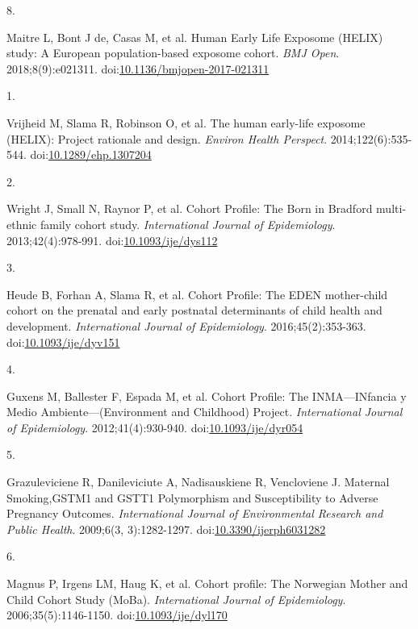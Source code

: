 \documentclass[
  letterpaper,
  DIV=11,
  numbers=noendperiod]{scrartcl}
\newlength{\cslhangindent}
\newlength{\csllabelwidth}
\newenvironment{CSLReferences}[2] %
 {\begin{list}{}{%
  \setlength{\itemindent}{0pt}
  \setlength{\leftmargin}{0pt}
  \setlength{\parsep}{0pt}
  \ifodd #1
   \setlength{\leftmargin}{\cslhangindent}
   \setlength{\itemindent}{-1\cslhangindent}
  \fi
  \setlength{\itemsep}{#2\baselineskip}}}
 {\end{list}}
\newcommand{\CSLLeftMargin}[1]{\parbox[t]{\csllabelwidth}{\strut#1\strut}}
\newcommand{\CSLRightInline}[1]{\parbox[t]{\linewidth - \csllabelwidth}{\strut#1\strut}}
\begin{document}
\begin{CSLReferences}{0}{1}
\CSLLeftMargin{8. }%
\CSLRightInline{Maitre L, Bont J de, Casas M, et al. Human {Early Life
Exposome} ({HELIX}) study: A {European} population-based exposome
cohort. \emph{BMJ Open}. 2018;8(9):e021311.
doi:\href{https://doi.org/10.1136/bmjopen-2017-021311}{10.1136/bmjopen-2017-021311}}

\CSLLeftMargin{1. }%
\CSLRightInline{Vrijheid M, Slama R, Robinson O, et al. The human
early-life exposome ({HELIX}): Project rationale and design.
\emph{Environ Health Perspect}. 2014;122(6):535-544.
doi:\href{https://doi.org/10.1289/ehp.1307204}{10.1289/ehp.1307204}}

\CSLLeftMargin{2. }%
\CSLRightInline{Wright J, Small N, Raynor P, et al. Cohort {Profile}:
{The Born} in {Bradford} multi-ethnic family cohort study.
\emph{International Journal of Epidemiology}. 2013;42(4):978-991.
doi:\href{https://doi.org/10.1093/ije/dys112}{10.1093/ije/dys112}}

\CSLLeftMargin{3. }%
\CSLRightInline{Heude B, Forhan A, Slama R, et al. Cohort {Profile}:
{The EDEN} mother-child cohort on the prenatal and early postnatal
determinants of child health and development. \emph{International
Journal of Epidemiology}. 2016;45(2):353-363.
doi:\href{https://doi.org/10.1093/ije/dyv151}{10.1093/ije/dyv151}}

\CSLLeftMargin{4. }%
\CSLRightInline{Guxens M, Ballester F, Espada M, et al. Cohort
{Profile}: {The INMA}---{INfancia} y {Medio Ambiente}---({Environment}
and {Childhood}) {Project}. \emph{International Journal of
Epidemiology}. 2012;41(4):930-940.
doi:\href{https://doi.org/10.1093/ije/dyr054}{10.1093/ije/dyr054}}

\CSLLeftMargin{5. }%
\CSLRightInline{Grazuleviciene R, Danileviciute A, Nadisauskiene R,
Vencloviene J. Maternal {Smoking},{GSTM1} and {GSTT1 Polymorphism} and
{Susceptibility} to {Adverse Pregnancy Outcomes}. \emph{International
Journal of Environmental Research and Public Health}. 2009;6(3,
3):1282-1297.
doi:\href{https://doi.org/10.3390/ijerph6031282}{10.3390/ijerph6031282}}

\CSLLeftMargin{6. }%
\CSLRightInline{Magnus P, Irgens LM, Haug K, et al. Cohort profile: {The
Norwegian Mother} and {Child Cohort Study} ({MoBa}). \emph{International
Journal of Epidemiology}. 2006;35(5):1146-1150.
doi:\href{https://doi.org/10.1093/ije/dyl170}{10.1093/ije/dyl170}}


\end{CSLReferences}
\end{document}
